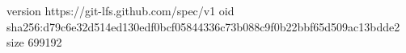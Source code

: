 version https://git-lfs.github.com/spec/v1
oid sha256:d79c6e32d514ed130edf0bcf05844336c73b088c9f0b22bbf65d509ac13bdde2
size 699192
